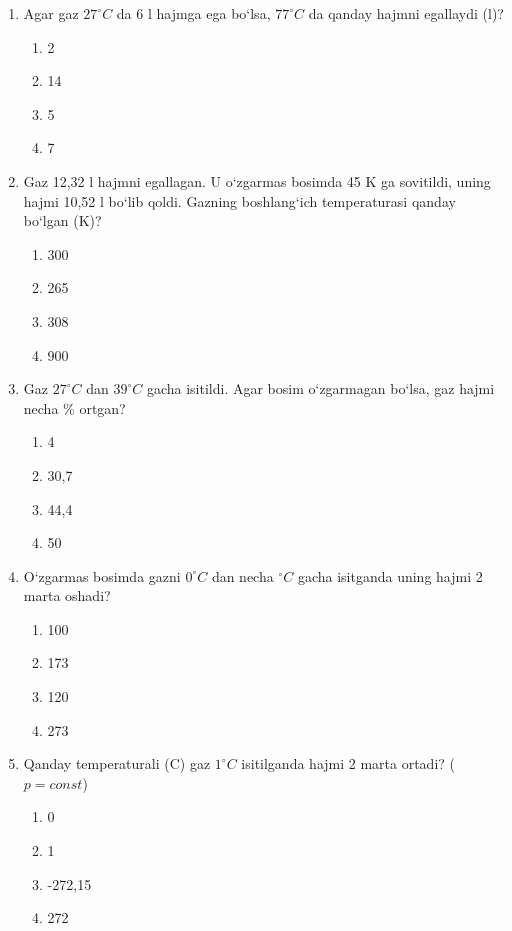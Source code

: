 \begin{enumerate}
\item Agar gaz $27^\circ C$ da 6 l hajmga ega bo‘lsa, $77^\circ C$ da qanday hajmni egallaydi (l)?
\begin{enumerate}[label=\Alph*)]
\item 2
\item 14
\item 5
\item 7
\end{enumerate}

\item Gaz 12,32 l hajmni egallagan. U o‘zgarmas bosimda 45 K ga sovitildi, uning hajmi 10,52 l bo‘lib qoldi. Gazning boshlang‘ich temperaturasi qanday bo‘lgan (K)?
\begin{enumerate}[label=\Alph*)]
\item 300
\item 265
\item 308
\item 900
\end{enumerate}

\item Gaz $27^\circ C$ dan $39^\circ C$ gacha isitildi. Agar bosim o‘zgarmagan bo‘lsa, gaz hajmi necha \% ortgan?
\begin{enumerate}[label=\Alph*)]
\item 4
\item 30,7
\item 44,4
\item 50
\end{enumerate}

\item O‘zgarmas bosimda gazni $0^\circ C$ dan necha $^\circ C$ gacha isitganda uning hajmi 2 marta oshadi?
\begin{enumerate}[label=\Alph*)]
\item 100
\item 173
\item 120
\item 273
\end{enumerate}

\item Qanday temperaturali (C) gaz $1^\circ C$ isitilganda hajmi 2 marta ortadi? ($p=const$)
\begin{enumerate}[label=\Alph*)]
\item 0
\item 1
\item -272,15
\item 272
\end{enumerate}


\end{enumerate}
